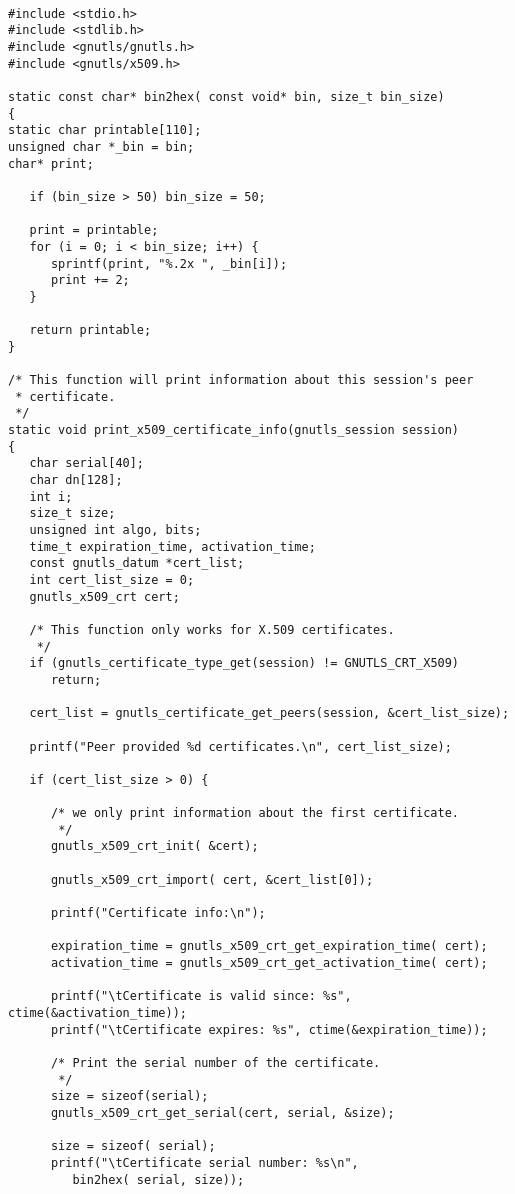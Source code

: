 \begin{verbatim}

#include <stdio.h>
#include <stdlib.h>
#include <gnutls/gnutls.h>
#include <gnutls/x509.h>

static const char* bin2hex( const void* bin, size_t bin_size)
{
static char printable[110];
unsigned char *_bin = bin;
char* print;

   if (bin_size > 50) bin_size = 50;

   print = printable;
   for (i = 0; i < bin_size; i++) {
      sprintf(print, "%.2x ", _bin[i]);
      print += 2;
   }

   return printable;
}

/* This function will print information about this session's peer
 * certificate. 
 */
static void print_x509_certificate_info(gnutls_session session)
{
   char serial[40];
   char dn[128];
   int i;
   size_t size;
   unsigned int algo, bits;
   time_t expiration_time, activation_time;
   const gnutls_datum *cert_list;
   int cert_list_size = 0;
   gnutls_x509_crt cert;

   /* This function only works for X.509 certificates.
    */
   if (gnutls_certificate_type_get(session) != GNUTLS_CRT_X509)
      return;

   cert_list = gnutls_certificate_get_peers(session, &cert_list_size);

   printf("Peer provided %d certificates.\n", cert_list_size);

   if (cert_list_size > 0) {

      /* we only print information about the first certificate.
       */
      gnutls_x509_crt_init( &cert);

      gnutls_x509_crt_import( cert, &cert_list[0]);

      printf("Certificate info:\n");

      expiration_time = gnutls_x509_crt_get_expiration_time( cert);
      activation_time = gnutls_x509_crt_get_activation_time( cert);

      printf("\tCertificate is valid since: %s", ctime(&activation_time));
      printf("\tCertificate expires: %s", ctime(&expiration_time));

      /* Print the serial number of the certificate.
       */
      size = sizeof(serial);
      gnutls_x509_crt_get_serial(cert, serial, &size);

      size = sizeof( serial);
      printf("\tCertificate serial number: %s\n", 
         bin2hex( serial, size));


\end{verbatim}
